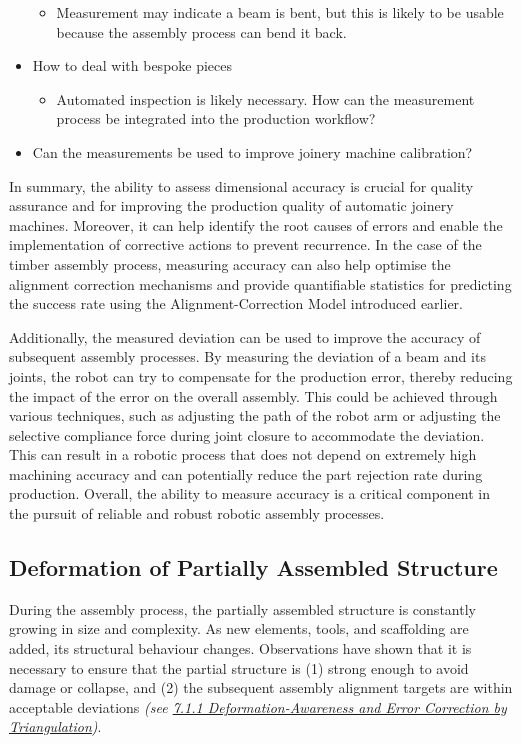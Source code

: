 \begin{itemize}[nosep]
\begin{itemize}
    	\item Measurement may indicate a beam is bent, but this is likely to be usable because the assembly process can bend it back.
    \end{itemize}
    
	\item How to deal with bespoke pieces
    \begin{itemize}
    	\item Automated inspection is likely necessary. How can the measurement process be integrated into the production workflow?
    \end{itemize}
    
    \item Can the measurements be used to improve joinery machine calibration?

\end{itemize}

In summary, the ability to assess dimensional accuracy is crucial for quality assurance and for improving the production quality of automatic joinery machines. Moreover, it can help identify the root causes of errors and enable the implementation of corrective actions to prevent recurrence. In the case of the timber assembly process, measuring accuracy can also help optimise the alignment correction mechanisms and provide quantifiable statistics for predicting the success rate using the Alignment-Correction Model introduced earlier.

Additionally, the measured deviation can be used to improve the accuracy of subsequent assembly processes. By measuring the deviation of a beam and its joints, the robot can try to compensate for the production error, thereby reducing the impact of the error on the overall assembly. This could be achieved through various techniques, such as adjusting the path of the robot arm or adjusting the selective compliance force during joint closure to accommodate the deviation. This can result in a robotic process that does not depend on extremely high machining accuracy and can potentially reduce the part rejection rate during production. Overall, the ability to measure accuracy is a critical component in the pursuit of reliable and robust robotic assembly processes.

\subsection{Deformation of Partially Assembled Structure}

During the assembly process, the partially assembled structure is constantly growing in size and complexity. As new elements, tools, and scaffolding are added, its structural behaviour changes. Observations have shown that it is necessary to ensure that the partial structure is (1) strong enough to avoid damage or collapse, and (2) the subsequent assembly alignment targets are within acceptable deviations \textit{(see \ul{7.1.1 Deformation-Awareness and Error Correction by Triangulation})}. 

